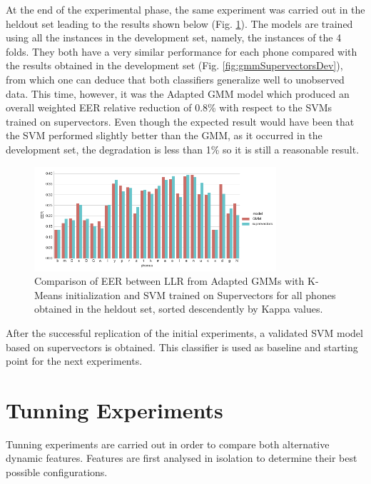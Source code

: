 At the end of the experimental phase,
the same experiment was carried out in the heldout set
leading to the results shown below
(Fig. \ref{fig:gmmSupervectorsTest}).
The models are trained using all the instances in the development set, namely, the
instances of the 4 folds.
They both have a very similar performance for each phone compared with the results obtained
in the development set (Fig. \ref{fig:gmmSupervectorsDev}),
from which one can deduce that both classifiers generalize well to
unobserved data. This time, however, it was the Adapted GMM model
which produced an overall weighted EER relative reduction of 0.8\% with respect to the SVMs
trained on supervectors. Even though the expected result would have been that the SVM performed
slightly better than the GMM, as it occurred in the development set,
the degradation is less than 1\% so it is still a reasonable result.


\begin{figure}[H]
	\centering
	\includegraphics[width=0.8\textwidth]{files/figures/results/gmm-vs-supervectors/gmm-vs-supervectors-heldout.png}
	\caption{Comparison of EER between LLR from Adapted GMMs with K-Means initialization
	and SVM trained on Supervectors for all phones obtained in the heldout set, sorted descendently
	by Kappa values.}
	\label{fig:gmmSupervectorsTest}
\end{figure}

After the successful replication of the initial experiments, a validated SVM model based on
supervectors is obtained. This classifier is used as baseline and starting point for
the next experiments.

\section{Tunning Experiments}

Tunning experiments are carried out in order to compare both alternative
dynamic features. Features are first analysed in isolation to
determine their best possible configurations.

